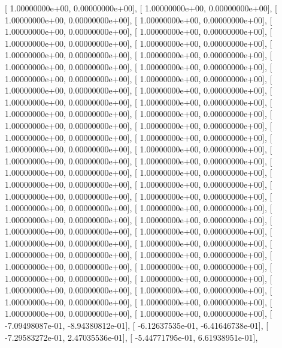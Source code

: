 \documentclass{article}
\begin{document}
       [  1.00000000e+00,   0.00000000e+00],
       [  1.00000000e+00,   0.00000000e+00],
       [  1.00000000e+00,   0.00000000e+00],
       [  1.00000000e+00,   0.00000000e+00],
       [  1.00000000e+00,   0.00000000e+00],
       [  1.00000000e+00,   0.00000000e+00],
       [  1.00000000e+00,   0.00000000e+00],
       [  1.00000000e+00,   0.00000000e+00],
       [  1.00000000e+00,   0.00000000e+00],
       [  1.00000000e+00,   0.00000000e+00],
       [  1.00000000e+00,   0.00000000e+00],
       [  1.00000000e+00,   0.00000000e+00],
       [  1.00000000e+00,   0.00000000e+00],
       [  1.00000000e+00,   0.00000000e+00],
       [  1.00000000e+00,   0.00000000e+00],
       [  1.00000000e+00,   0.00000000e+00],
       [  1.00000000e+00,   0.00000000e+00],
       [  1.00000000e+00,   0.00000000e+00],
       [  1.00000000e+00,   0.00000000e+00],
       [  1.00000000e+00,   0.00000000e+00],
       [  1.00000000e+00,   0.00000000e+00],
       [  1.00000000e+00,   0.00000000e+00],
       [  1.00000000e+00,   0.00000000e+00],
       [  1.00000000e+00,   0.00000000e+00],
       [  1.00000000e+00,   0.00000000e+00],
       [  1.00000000e+00,   0.00000000e+00],
       [  1.00000000e+00,   0.00000000e+00],
       [  1.00000000e+00,   0.00000000e+00],
       [  1.00000000e+00,   0.00000000e+00],
       [  1.00000000e+00,   0.00000000e+00],
       [  1.00000000e+00,   0.00000000e+00],
       [  1.00000000e+00,   0.00000000e+00],
       [  1.00000000e+00,   0.00000000e+00],
       [  1.00000000e+00,   0.00000000e+00],
       [  1.00000000e+00,   0.00000000e+00],
       [  1.00000000e+00,   0.00000000e+00],
       [  1.00000000e+00,   0.00000000e+00],
       [  1.00000000e+00,   0.00000000e+00],
       [  1.00000000e+00,   0.00000000e+00],
       [  1.00000000e+00,   0.00000000e+00],
       [  1.00000000e+00,   0.00000000e+00],
       [  1.00000000e+00,   0.00000000e+00],
       [  1.00000000e+00,   0.00000000e+00],
       [  1.00000000e+00,   0.00000000e+00],
       [  1.00000000e+00,   0.00000000e+00],
       [  1.00000000e+00,   0.00000000e+00],
       [  1.00000000e+00,   0.00000000e+00],
       [  1.00000000e+00,   0.00000000e+00],
       [  1.00000000e+00,   0.00000000e+00],
       [  1.00000000e+00,   0.00000000e+00],
       [  1.00000000e+00,   0.00000000e+00],
       [  1.00000000e+00,   0.00000000e+00],
       [  1.00000000e+00,   0.00000000e+00],
       [  1.00000000e+00,   0.00000000e+00],
       [ -7.09498087e-01,  -8.94380812e-01],
       [ -6.12637535e-01,  -6.41646738e-01],
       [ -7.29583272e-01,   2.47035536e-01],
       [ -5.44771795e-01,   6.61938951e-01],
\end{document}
